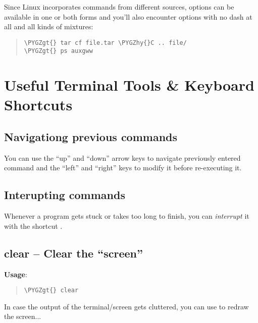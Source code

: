 \documentclass[a4paper,11pt,english]{sphinxmanual}
\def\PYGZgt{\char`\>}
\def\PYGZhy{\char`\-}
\begin{document}
Since Linux incorporates commands from different sources, options can be available in one or both forms and you’ll also encounter options with no dash at all and all kinds of mixtures:
\begin{quote}

\begin{Verbatim}[frame=single, rulecolor=\color{lightgray}, fontfamily=courier, commandchars=\\\{\}]
\PYGZgt{} tar cf file.tar \PYGZhy{}C .. file/
\PYGZgt{} ps auxgww
\end{Verbatim}
\end{quote}


\section{Useful Terminal Tools \& Keyboard Shortcuts}
\label{introduction:useful-terminal-tools-keyboard-shortcuts}

\subsection{Navigationg previous commands}
\label{introduction:navigationg-previous-commands}
You can use the ``up'' and ``down'' arrow keys to navigate previously entered command and the ``left'' and
``right'' keys to modify it before re-executing it.


\subsection{Interupting commands}
\label{introduction:interupting-commands}
Whenever a program gets stuck or takes too long to finish, you can \emph{interrupt} it with the shortcut
.


\subsection{clear – Clear the “screen”}
\label{introduction:clear-clear-the-screen}
\textbf{Usage}:  
\begin{quote}

\begin{Verbatim}[frame=single, rulecolor=\color{lightgray}, fontfamily=courier, commandchars=\\\{\}]
\PYGZgt{} clear
\end{Verbatim}
\end{quote}

In case the output of the terminal/screen gets cluttered, you can use  to redraw the screen...
\end{document}
